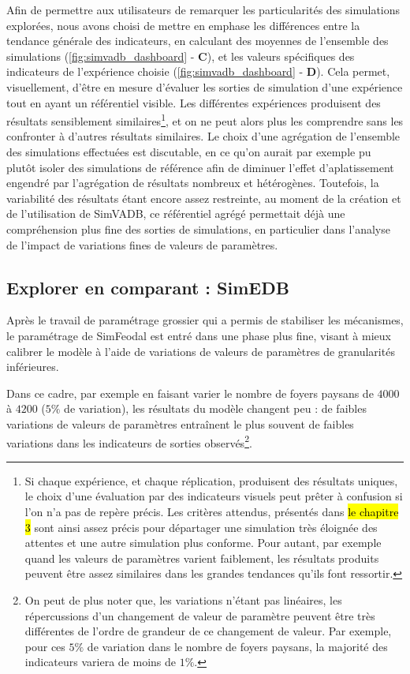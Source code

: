 	Afin de permettre aux utilisateurs de remarquer les particularités des simulations explorées, nous avons choisi de mettre en emphase les différences entre la tendance générale des indicateurs, en calculant des moyennes de l'ensemble des simulations (\cref{fig:simvadb_dashboard} - \textbf{C}), et les valeurs spécifiques des indicateurs de l'expérience choisie (\cref{fig:simvadb_dashboard} - \textbf{D}).
	Cela permet, visuellement, d'être en mesure d'évaluer les sorties de simulation d'une expérience tout en ayant un référentiel visible.
	Les différentes expériences produisent des résultats sensiblement similaires\footnote{
		Si chaque expérience, et chaque réplication, produisent des résultats uniques, le choix d'une évaluation par des indicateurs visuels peut prêter à confusion si l'on n'a pas de repère précis.
		Les critères attendus, présentés dans \hl{le chapitre 3} sont ainsi assez précis pour départager une simulation très éloignée des attentes et une autre simulation plus conforme.
		Pour autant, par exemple quand les valeurs de paramètres varient faiblement, les résultats produits peuvent être assez similaires dans les grandes tendances qu'ils font ressortir.

	}, et on ne peut alors plus les comprendre sans les confronter à d'autres résultats similaires.
	Le choix d'une agrégation de l'ensemble des simulations effectuées est discutable, en ce qu'on aurait par exemple pu plutôt isoler des simulations \og de référence \fg{} afin de diminuer l'effet \og d’aplatissement \fg{} engendré par l'agrégation de résultats nombreux et hétérogènes.
	Toutefois, la variabilité des résultats étant encore assez restreinte, au moment de la création et de l'utilisation de SimVADB, ce référentiel agrégé permettait déjà une compréhension plus fine des sorties de simulations, en particulier dans l'analyse de l'impact de variations fines de valeurs de paramètres.

	\subsection{Explorer en comparant : SimEDB}\label{subsec:explorer-simedb}

	Après le travail de paramétrage grossier qui a permis de stabiliser les mécanismes, le paramétrage de SimFeodal est entré dans une phase plus fine, visant à mieux calibrer le modèle à l'aide de variations de valeurs de paramètres de granularités inférieures.

	Dans ce cadre, par exemple en faisant varier le nombre de foyers paysans de $4000$ à $4200$ ($5\%$ de variation), les résultats du modèle changent peu :  de faibles variations de valeurs de paramètres entraînent le plus souvent de faibles variations dans les indicateurs de sorties observés\footnote{
	On peut de plus noter que, les variations n'étant pas linéaires, les répercussions d'un changement de valeur de paramètre peuvent être très différentes de l'ordre de grandeur de ce changement de valeur. Par exemple, pour ces $5\%$ de variation dans le nombre de foyers paysans, la majorité des indicateurs variera de moins de $1\%$.
	}.

